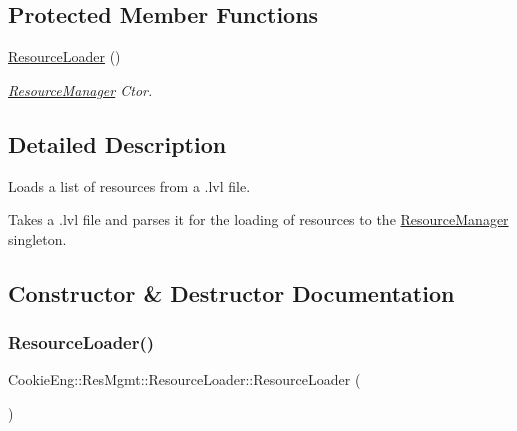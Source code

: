 \subsection*{Protected Member Functions}
\begin{DoxyCompactItemize}
\item 
\hyperlink{class_cookie_eng_1_1_res_mgmt_1_1_resource_loader_a5225d2279517669dbf0f6f32a09e7b8d}{Resource\+Loader} ()
\begin{DoxyCompactList}\small\item\em \hyperlink{class_cookie_eng_1_1_res_mgmt_1_1_resource_manager}{Resource\+Manager} Ctor. \end{DoxyCompactList}\end{DoxyCompactItemize}


\subsection{Detailed Description}
Loads a list of resources from a .lvl file. 

Takes a .lvl file and parses it for the loading of resources to the \hyperlink{class_cookie_eng_1_1_res_mgmt_1_1_resource_manager}{Resource\+Manager} singleton. 

\subsection{Constructor \& Destructor Documentation}
\mbox{\label{class_cookie_eng_1_1_res_mgmt_1_1_resource_loader_a5225d2279517669dbf0f6f32a09e7b8d}} 
\subsubsection{\texorpdfstring{Resource\+Loader()}{ResourceLoader()}}
{\footnotesize\ttfamily Cookie\+Eng\+::\+Res\+Mgmt\+::\+Resource\+Loader\+::\+Resource\+Loader (\begin{DoxyParamCaption}{ }\end{DoxyParamCaption})\hspace{0.3cm}{\ttfamily [protected]}}



